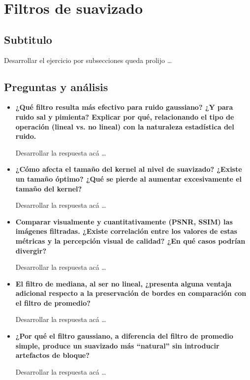 \section{Filtros de suavizado}

    \subsection{Subtitulo}

        Desarrollar el ejercicio por subsecciones queda prolijo \dots

    \subsection{Preguntas y análisis}

        \begin{itemize}[leftmargin=*]
            \item \textbf{¿Qué filtro resulta más efectivo para ruido gaussiano? ¿Y para ruido sal y pimienta? Explicar por qué, relacionando el tipo de operación (lineal vs. no lineal) con la naturaleza estadística del ruido.}
            
                Desarrollar la respuesta acá \dots
            
            \item \textbf{¿Cómo afecta el tamaño del kernel al nivel de suavizado? ¿Existe un tamaño óptimo? ¿Qué se pierde al aumentar excesivamente el tamaño del kernel?}
            
                Desarrollar la respuesta acá \dots
            
            \item \textbf{Comparar visualmente y cuantitativamente (PSNR, SSIM) las imágenes filtradas. ¿Existe correlación entre los valores de estas métricas y la percepción visual de calidad? ¿En qué casos podrían divergir?}
            
                Desarrollar la respuesta acá \dots
            
            \item \textbf{El filtro de mediana, al ser no lineal, ¿presenta alguna ventaja adicional respecto a la preservación de bordes en comparación con el filtro de promedio?}
            
                Desarrollar la respuesta acá \dots
            
            \item \textbf{¿Por qué el filtro gaussiano, a diferencia del filtro de promedio simple, produce un suavizado más ``natural'' sin introducir artefactos de bloque?} 
            
                Desarrollar la respuesta acá \dots
        \end{itemize}
